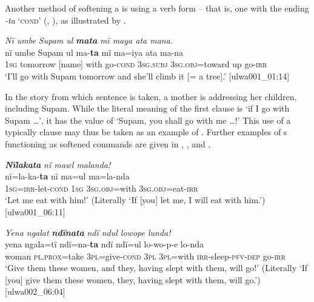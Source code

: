 
Another method of softening a  is using a  verb form – that is, one with the ending \textit{-ta} ‘\textsc{cond}’ (, ), as illustrated by .

\ea%
    \label{ex:syntax:94}
          \textit{Nï umbe Supam ul} \textbf{\textit{mata}} \textit{mï maya ata mana.}\\
\gll    nï    umbe    Supam  ul    ma-\textbf{ta}    mï     ma=iya      ata  ma-na\\
    \textsc{1sg}  tomorrow  [name]  with  go-\textsc{cond}  3\textsc{sg.subj}    \textsc{3sg.obj}=toward  up  go-\textsc{irr}\\
\glt `I’ll go with Supam tomorrow and she’ll climb it [= a tree].’ [ulwa001\_01:14]
\z

In the story from which sentence  is taken, a mother is addressing her children, including Supam. While the literal meaning of the first clause is ‘if I go with Supam …’, it has the  value of ‘Supam, you shall go with me …!’ This  use of a typically   clause may thus be taken as an example of  \citep{Evans2007}. Further examples of s functioning as softened commands are given in , , and .

\ea%
    \label{ex:syntax:95}
          \textbf{\textit{Nïlakata}} \textit{nï mawl malanda!}\\
\gll    nï=la-ka-\textbf{ta}    nï    ma=ul      ma=la-nda\\
    \textsc{1sg}=\textsc{irr-}let-\textsc{cond}  \textsc{1sg}  3\textsc{sg.obj}=with  3\textsc{sg.obj}=eat-\textsc{irr}\\
\glt `Let me eat with him!’ (Literally ‘If [you] let me, I will eat with him.’) [ulwa001\_06:11]
\z

\newpage

\ea%
    \label{ex:syntax:96}
          \textit{Yena ngalat} \textbf{\textit{ndïnata}} \textit{ndï ndul lowope lunda!}\\
\gll    yena  ngala=tï    ndï=na-\textbf{ta}      ndï  ndï=ul     lo-wo-p-e      lo-nda\\
    woman  \textsc{pl.prox}=take  \textsc{3pl}=give-\textsc{cond}  \textsc{3pl}  \textsc{3pl=}with    \textsc{irr}{}-sleep-\textsc{pfv-dep}  go-\textsc{irr}\\
\glt `Give them these women, and they, having slept with them, will go!’ (Literally ‘If [you] give them these women, they, having slept with them, will go.’) [ulwa002\_06:04]
\z

